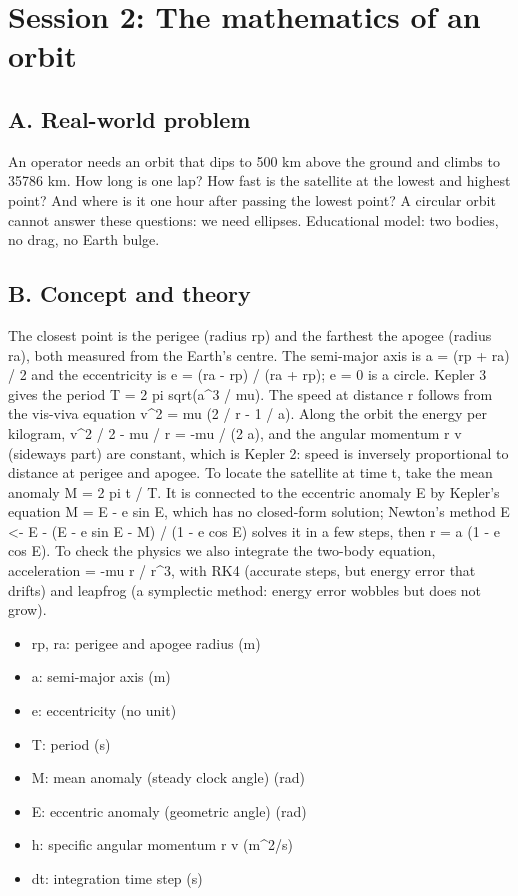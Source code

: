 \documentclass[11pt,a4paper]{article}
\begin{document}
\section{Session 2: The mathematics of an orbit}

\subsection*{A. Real-world problem}
An operator needs an orbit that dips to 500 km above the ground and climbs to 35786 km. How long is one lap? How fast is the satellite at the lowest and highest point? And where is it one hour after passing the lowest point? A circular orbit cannot answer these questions: we need ellipses. Educational model: two bodies, no drag, no Earth bulge.

\subsection*{B. Concept and theory}
The closest point is the perigee (radius rp) and the farthest the apogee (radius ra), both measured from the Earth's centre. The semi-major axis is a = (rp + ra) / 2 and the eccentricity is e = (ra - rp) / (ra + rp); e = 0 is a circle. Kepler 3 gives the period T = 2 pi sqrt(a\textasciicircum{}3 / mu). The speed at distance r follows from the vis-viva equation v\textasciicircum{}2 = mu (2 / r - 1 / a). Along the orbit the energy per kilogram, v\textasciicircum{}2 / 2 - mu / r = -mu / (2 a), and the angular momentum r v (sideways part) are constant, which is Kepler 2: speed is inversely proportional to distance at perigee and apogee. To locate the satellite at time t, take the mean anomaly M = 2 pi t / T. It is connected to the eccentric anomaly E by Kepler's equation M = E - e sin E, which has no closed-form solution; Newton's method E \textless{}- E - (E - e sin E - M) / (1 - e cos E) solves it in a few steps, then r = a (1 - e cos E). To check the physics we also integrate the two-body equation, acceleration = -mu r / \textbar{}r\textbar{}\textasciicircum{}3, with RK4 (accurate steps, but energy error that drifts) and leapfrog (a symplectic method: energy error wobbles but does not grow).

\begin{itemize}[nosep]
\item rp, ra: perigee and apogee radius (m)
\item a: semi-major axis (m)
\item e: eccentricity (no unit)
\item T: period (s)
\item M: mean anomaly (steady clock angle) (rad)
\item E: eccentric anomaly (geometric angle) (rad)
\item h: specific angular momentum r v (m\textasciicircum{}2/s)
\item dt: integration time step (s)
\end{itemize}
\end{document}
